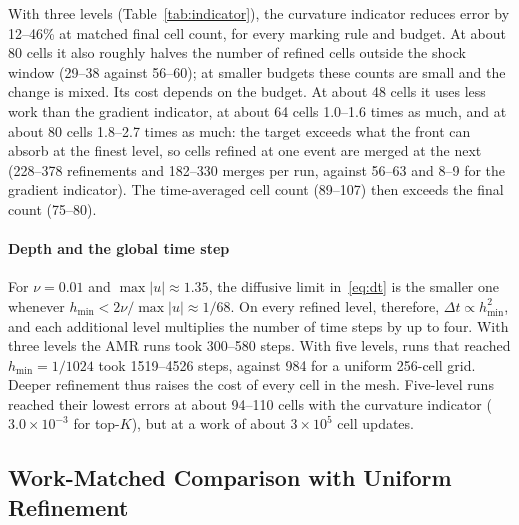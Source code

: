 \documentclass[conference]{IEEEtran}
\begin{document}
With three levels (Table~\ref{tab:indicator}), the curvature indicator reduces error by 12--46\% at matched final cell count, for every marking rule and budget. At about 80 cells it also roughly halves the number of refined cells outside the shock window (29--38 against 56--60); at smaller budgets these counts are small and the change is mixed. Its cost depends on the budget. At about 48 cells it uses less work than the gradient indicator, at about 64 cells 1.0--1.6 times as much, and at about 80 cells 1.8--2.7 times as much: the target exceeds what the front can absorb at the finest level, so cells refined at one event are merged at the next (228--378 refinements and 182--330 merges per run, against 56--63 and 8--9 for the gradient indicator). The time-averaged cell count (89--107) then exceeds the final count (75--80).

\begin{table}[t]
\caption{Gradient versus curvature indicator, second-order scheme, three refinement levels, shared gradient-based gate. Steps: time steps taken. Refined/merged: totals per run. Regrids: events at which the gate was open. Turnover: mean (number of valid event pairs). Gumbel top-$K$: mean $\pm$ standard deviation over 10 seeds.}
\label{tab:indicator}
\centering
\resizebox{\textwidth}{!}{}
\end{table}

\paragraph*{Depth and the global time step}
For $\nu = 0.01$ and $\max|u| \approx 1.35$, the diffusive limit in~\eqref{eq:dt} is the smaller one whenever $h_{\min} < 2\nu/\max|u| \approx 1/68$. On every refined level, therefore, $\Delta t \propto h_{\min}^2$, and each additional level multiplies the number of time steps by up to four. With three levels the AMR runs took 300--580 steps. With five levels, runs that reached $h_{\min} = 1/1024$ took 1519--4526 steps, against 984 for a uniform 256-cell grid. Deeper refinement thus raises the cost of every cell in the mesh. Five-level runs reached their lowest errors at about 94--110 cells with the curvature indicator ($3.0\times10^{-3}$ for top-$K$), but at a work of about $3\times10^{5}$ cell updates.

\subsection{Work-Matched Comparison with Uniform Refinement}
\label{sec:workmatched}
\end{document}
